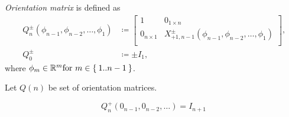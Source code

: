 \documentclass[../main.tex]{subfiles}
\begin{document}
\begin{definition}\label{M:Orientation}
\textit{Orientation matrix} is defined as
\begin{align*}
Q^{\pm}_n\left(\phi_{n-1},\phi_{n-2},\dots,\phi_1\right)
&\coloneqq
\begin{bmatrix}
1&0_{1\times n}\\
0_{n\times 1}&X^{\pm}_{+1,n-1}\left(\phi_{n-1},\phi_{n-2},\dots,\phi_1\right)\\
\end{bmatrix}\text{,}\\
Q^{\pm}_0
&\coloneqq\pm I_1\text{,}
\end{align*}
where \(\phi_m\in\mathbb{R}^m\text{for } m\in\Set{1..n-1}\).
\end{definition}
\begin{definition}\label{M:Orientation:Set}
Let \(Q\left(n\right)\) be set of orientation matrices.
\end{definition}
\begin{corollary}\label{M:Orientation:Set:Identity}
\[
Q^{+}_{n}
\left(0_{n-1}, 0_{n-2},\dots\right)
=
I_{n+1}
\]
\end{corollary}
\end{document}

